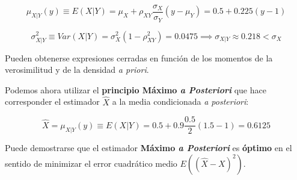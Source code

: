 \documentclass[11pt]{article}
\begin{document}
\[
\mu_{X | Y}(y) \equiv E(X | Y) = \mu_{X}+\rho_{XY} \frac{\sigma_{X}}{\sigma_{Y}}\left(y-\mu_{Y}\right) = 0.5 + 0.225 (y -1)
\]

\[
\sigma_{X | Y}^2 \equiv Var(X | Y) = \sigma_{X}^2 (1-\rho_{XY}^{2}) =0.0475 \implies \sigma_{X | Y} \approx 0.218 < \sigma_X
\]

Pueden obtenerse expresiones cerradas en función de los momentos de la
verosimilitud y de la densidad \emph{a priori}.

Podemos ahora utilizar el \textbf{principio Máximo \emph{a Posteriori}}
que hace corresponder el estimador \(\hat{X}\) a la media condicionada
\emph{a posteriori}:

\[
\hat{X} = \mu_{X | Y}(y) \equiv E(X | Y) = 0.5 + 0.9 \frac{0.5}{2}(1.5-1) = 0.6125
\]

Puede demostrarse que el estimador \textbf{Máximo \emph{a Posteriori}}
es \textbf{óptimo} en el sentido de minimizar el error cuadrático medio
\(E((\hat{X}-X)^2)\).


    
    
    
    
\end{document}
